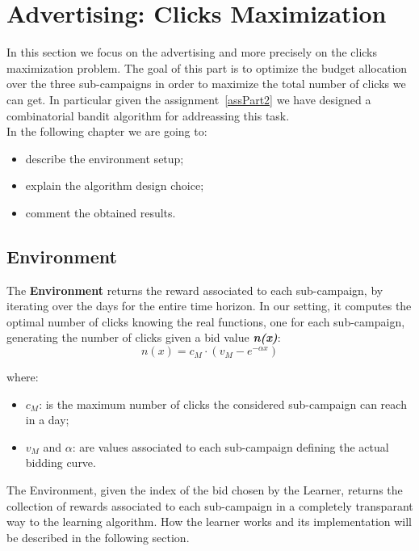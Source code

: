 \chapter{Advertising: Clicks Maximization}

In this section we focus on the advertising and more precisely on the clicks maximization problem.
The goal of this part is to optimize the budget allocation over the three sub-campaigns in order to maximize the total number of clicks we can get.
In particular given the assignment~\ref{assPart2} we have designed a combinatorial bandit algorithm for addreassing this task.\\
In the following chapter we are going to:
\begin{itemize}
	\item describe the environment setup;
	\item explain the algorithm design choice;
	\item comment the obtained results.
\end{itemize}

\section{Environment}
The \textbf{Environment} returns the reward associated to each sub-campaign, by iterating over the days for the entire time horizon.
In our setting, it computes the optimal number of clicks knowing the real functions, one for each sub-campaign, generating  the number of clicks given a bid value \textbf{\textit{n(x)}}:\\

\begin{equation}
	n(x) = c_{M} \cdot (v_{M} - e^{-\alpha x})
\end{equation}

where:
\begin{itemize}
	\item $c_{M}$: is the maximum number of clicks the considered sub-campaign can reach in a day;
	\item $v_{M}$ and $\alpha$: are values associated to each sub-campaign defining the actual bidding curve.
\end{itemize}


The Environment, given the index of the bid chosen by the Learner, returns the collection of rewards associated to each sub-campaign in a completely transparant way to the learning algorithm.
How the learner works and its implementation will be described in the following section.



